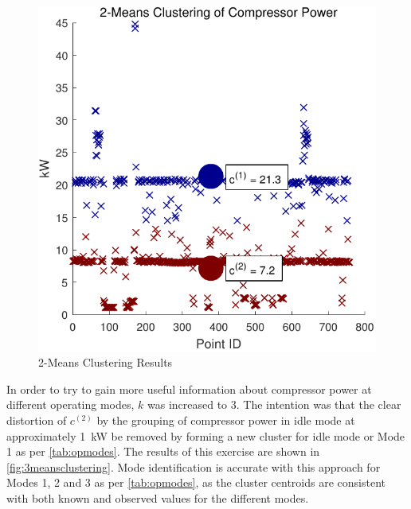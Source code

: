 \begin{figure}
\includegraphics[width = \columnwidth]{./Images/2MeansClustering.pdf}
\caption{2-Means Clustering Results}
\label{fig:twomeansclustering}
\end{figure}

In order to try to gain more useful information about compressor power at different operating modes, $k$ was increased to 3. The intention was that the clear distortion of $c^{(2)}$ by the grouping of compressor power in idle mode at approximately \SI{1}{\kilo \watt} be removed by forming a new cluster for idle mode or Mode 1 as per \autoref{tab:opmodes}. The results of this exercise are shown in \autoref{fig:3meansclustering}. Mode identification is accurate with this approach for Modes 1, 2 and 3 as per \autoref{tab:opmodes}, as the cluster centroids are consistent with both known and observed values for the different modes.

